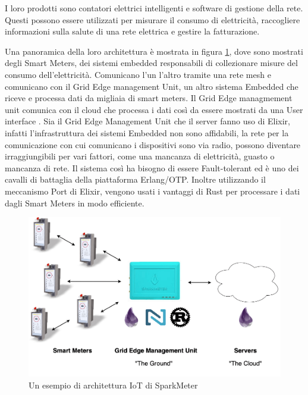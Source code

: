 I loro prodotti sono contatori elettrici
intelligenti e software di gestione della rete.
Questi possono essere utilizzati per misurare
il consumo di elettricità, raccogliere informazioni
sulla salute di una rete elettrica e gestire
la fatturazione.

Una panoramica della loro architettura è mostrata
in figura \ref{fig:architettura_spark}, dove sono
mostrati degli Smart Meters, dei sistemi embedded
responsabili di collezionare misure del consumo
dell'elettricità. Comunicano l'un l'altro tramite
una rete mesh e comunicano con il Grid Edge
management Unit, un altro sistema Embedded che
riceve e processa dati da migliaia di smart meters.
Il Grid Edge managmement unit comunica con il cloud
che processa i dati così da essere mostrati
da una User interface \cite{Embedded35:online}.
Sia il Grid Edge Management Unit che il server
fanno uso di Elixir, infatti l'infrastruttura
dei sistemi Embedded non sono affidabili, 
la rete per la comunicazione con cui comunicano i
dispositivi sono via radio,
possono diventare irraggiungibili per vari fattori,
come una mancanza di elettricità, guasto o mancanza di rete.
Il sistema così ha bisogno di essere Fault-tolerant ed è
uno dei cavalli di battaglia della piattaforma Erlang/OTP.
Inoltre utilizzando il meccanismo Port di Elixir,
vengono usati i vantaggi di Rust per processare
i dati dagli Smart Meters in modo efficiente.

\begin{figure}[!htp]
    \centering
    \includegraphics[keepaspectratio=true,scale=0.33]{images/sparkmeter-new-architecture.png}
	\caption{Un esempio di architettura IoT di SparkMeter\cite{Embedded35:online}}
  	\label{fig:architettura_spark}
\end{figure}



